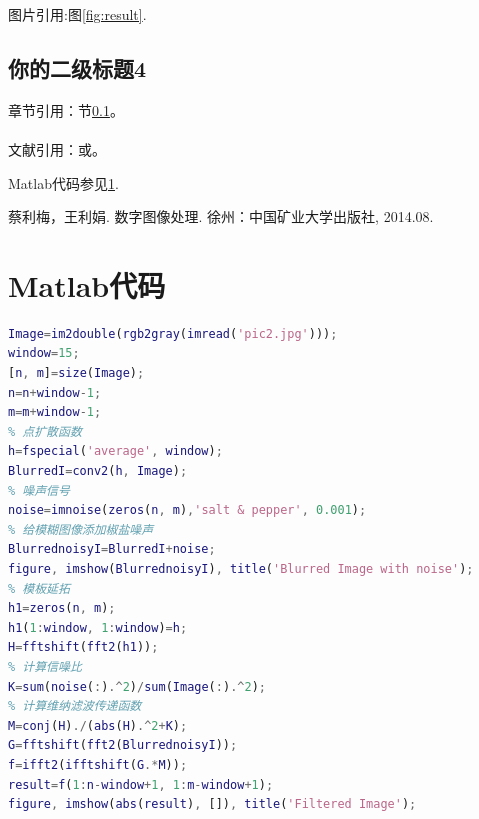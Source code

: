 \documentclass{zjgsureport}
\renewcommand\thesection{\zhnum{section}、}
\newcommand{\upcite}[1]{\textsuperscript{\textsuperscript{\cite{#1}}}}
\renewcommand\appendix{\par
    \setcounter{section}{0}
    \setcounter{subsection}{0}
    \gdef\thesection{附录\zhnum{section}}}
\begin{document}
图片引用:图\ref{fig:result}.


\subsection{你的二级标题4} \label{else}

章节引用：节\ref{else}。

文献引用：\cite{cai}或\upcite{cai}。

Matlab代码参见\ref{app:1}.
\clearpage

\begin{thebibliography}{99}
    蔡利梅，王利娟. 数字图像处理. 徐州：中国矿业大学出版社, 2014.08.
\end{thebibliography}
\clearpage

\appendix
\small
\section{Matlab代码} \label{app:1}
\begin{lstlisting}[language=matlab]
Image=im2double(rgb2gray(imread('pic2.jpg')));
window=15;
[n, m]=size(Image);
n=n+window-1;
m=m+window-1;
% 点扩散函数
h=fspecial('average', window);
BlurredI=conv2(h, Image);
% 噪声信号
noise=imnoise(zeros(n, m),'salt & pepper', 0.001);
% 给模糊图像添加椒盐噪声
BlurrednoisyI=BlurredI+noise;
figure, imshow(BlurrednoisyI), title('Blurred Image with noise');
% 模板延拓
h1=zeros(n, m);
h1(1:window, 1:window)=h;
H=fftshift(fft2(h1));
% 计算信噪比
K=sum(noise(:).^2)/sum(Image(:).^2);
% 计算维纳滤波传递函数
M=conj(H)./(abs(H).^2+K);
G=fftshift(fft2(BlurrednoisyI));
f=ifft2(ifftshift(G.*M));
result=f(1:n-window+1, 1:m-window+1);
figure, imshow(abs(result), []), title('Filtered Image');
\end{lstlisting}
\end{document}
